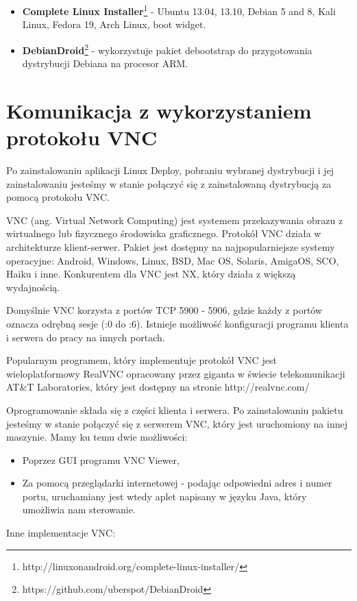 \begin{itemize}
	
	\item \textbf{Complete Linux Installer}\footnote{http://linuxonandroid.org/complete-linux-installer/} - Ubuntu 13.04, 13.10, Debian 5 and 8, Kali Linux, Fedora 19, Arch Linux, boot widget.
	
	\item\textbf{ DebianDroid}\footnote{https://github.com/uberspot/DebianDroid} - wykorzystuje pakiet debootstrap do przygotowania dystrybucji Debiana na procesor ARM.
	
\end{itemize}

\section{Komunikacja z wykorzystaniem protokołu VNC}
Po zainstalowaniu aplikacji Linux Deploy, pobraniu wybranej dystrybucji i jej zainstalowaniu jesteśmy w stanie połączyć się z zainstalowaną dystrybucją za pomocą protokołu VNC.

VNC (ang. Virtual Network Computing) jest systemem przekazywania obrazu z wirtualnego lub fizycznego środowiska graficznego. Protokół VNC działa w architekturze klient-serwer. Pakiet jest dostępny na najpopularniejsze systemy operacyjne: Android, Windows, Linux, BSD, Mac OS, Solaris, AmigaOS, SCO, Haiku i inne. Konkurentem dla VNC jest NX, który działa z większą wydajnością. 

Domyślnie VNC korzysta z portów TCP 5900 - 5906, gdzie każdy z portów oznacza odrębną sesje (:0 do :6). Istnieje możliwość konfiguracji programu klienta i serwera do pracy na innych portach. 

Popularnym programem, który implementuje protokół VNC jest wieloplatformowy RealVNC opracowany przez giganta w świecie telekomunikacji AT\&T Laboratories, który jest dostępny na stronie http://realvnc.com/

Oprogramowanie składa się z części klienta i serwera. Po zainstalowaniu pakietu jesteśmy w stanie połączyć się z serwerem VNC, który jest uruchomiony na innej maszynie. Mamy ku temu dwie możliwości:
\begin{itemize}
	\item Poprzez GUI programu VNC Viewer, 
	\item Za pomocą przeglądarki internetowej - podając odpowiedni adres i numer portu, uruchamiany jest wtedy aplet napisany w języku Java, który umożliwia nam sterowanie. 
\end{itemize}   

Inne implementacje VNC:

